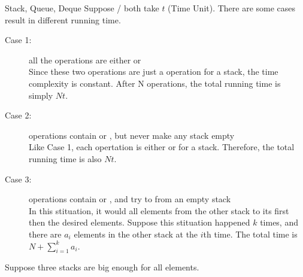 \begin{homeworkProblem}{Stack, Queue, Deque}
    Suppose / both take $t$ (Time Unit).
    There are some cases result in different running time.
    \begin{description}
    \item[Case 1:] all the operations are either  or  \\
        Since these two operations are just a  operation for a stack, the 
        time complexity is constant. After N operations, the total running time is 
        simply $Nt$.
    \item[Case 2:] operations contain  or , but never make
        any stack empty \\
        Like Case 1, each opertation is either  or  for a stack.
        Therefore, the total running time is also $Nt$.
    \item[Case 3:] operations contain  or , and try to 
        from an empty stack \\
        In this stituation, it would  all elements from the other stack to its 
        first then  the desired elements. Suppose this stituation happened $k$
        times, and there are $a_i$ elements in the other stack at the $i$th time.
        The total time is $N + \sum\limits_{i=1}^k a_i $.

    \end{description}


    \pagebreak
    
    Suppose three stacks are big enough for all elements.

    \begin{figure}[h!]
        \centering
\end{figure}
\end{homeworkProblem}
